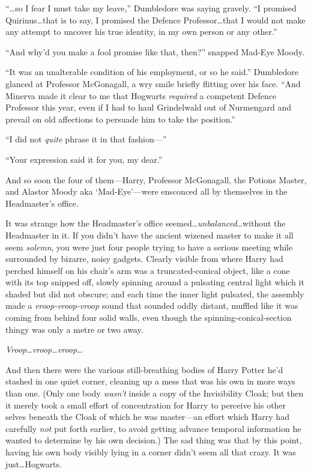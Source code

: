 “…so I fear I must take my leave,” Dumbledore was saying gravely. “I promised Quirinus…that is to say, I promised the Defence Professor…that I would not make any attempt to uncover his true identity, in my own person or any other.”

“And why’d you make a fool promise like that, then?” snapped Mad-Eye Moody.

“It was an unalterable condition of his employment, or so he said.” Dumbledore glanced at Professor McGonagall, a wry smile briefly flitting over his face. “And Minerva made it clear to me that Hogwarts \emph{required} a competent Defence Professor this year, even if I had to haul Grindelwald out of Nurmengard and prevail on old affections to persuade him to take the position.”

“I did not \emph{quite} phrase it in that fashion—”

“Your expression said it for you, my dear.”

And so soon the four of them—Harry, Professor McGonagall, the Potions Master, and Alastor Moody aka ‘Mad-Eye’—were ensconced all by themselves in the Headmaster’s office.

It was strange how the Headmaster’s office seemed…\emph{unbalanced}…without the Headmaster in it. If you didn’t have the ancient wizened master to make it all seem \emph{solemn}, you were just four people trying to have a serious meeting while surrounded by bizarre, noisy gadgets. Clearly visible from where Harry had perched himself on his chair’s arm was a truncated-conical object, like a cone with its top snipped off, slowly spinning around a pulsating central light which it shaded but did not obscure; and each time the inner light pulsated, the assembly made a \emph{vroop-vroop-vroop} sound that sounded oddly distant, muffled like it was coming from behind four solid walls, even though the spinning-conical-section thingy was only a metre or two away.

\emph{Vroop…vroop…vroop}…

And then there were the various still-breathing bodies of Harry Potter he’d stashed in one quiet corner, cleaning up a mess that was his own in more ways than one. (Only one body \emph{wasn’t} inside a copy of the Invisibility Cloak; but then it merely took a small effort of concentration for Harry to perceive his other selves beneath the Cloak of which he was master—an effort which Harry had carefully \emph{not} put forth earlier, to avoid getting advance temporal information he wanted to determine by his own decision.) The sad thing was that by this point, having his own body visibly lying in a corner didn’t seem all that crazy. It was just…Hogwarts.

